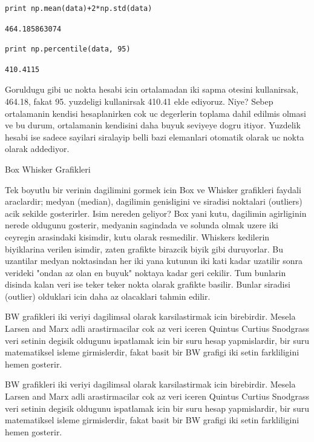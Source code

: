 \documentclass[12pt,fleqn]{article}\usepackage{../common}
\begin{document}
\begin{verbatim}
print np.mean(data)+2*np.std(data)
\end{verbatim}

\begin{verbatim}
464.185863074
\end{verbatim}

\begin{verbatim}
print np.percentile(data, 95)
\end{verbatim}

\begin{verbatim}
410.4115
\end{verbatim}

Goruldugu gibi uc nokta hesabi icin ortalamadan iki sapma otesini
kullanirsak, 464.18, fakat 95. yuzdeligi kullanirsak 410.41 elde
ediyoruz. Niye? Sebep ortalamanin kendisi hesaplanirken cok uc
degerlerin toplama dahil edilmis olmasi ve bu durum, ortalamanin
kendisini daha buyuk seviyeye dogru itiyor. Yuzdelik hesabi ise sadece
sayilari siralayip belli bazi elemanlari otomatik olarak uc nokta
olarak addediyor.

Box Whisker Grafikleri

Tek boyutlu bir verinin dagilimini gormek icin Box ve Whisker grafikleri
faydali araclardir; medyan (median), dagilimin genisligini ve siradisi
noktalari (outliers) acik sekilde gosterirler. Isim nereden geliyor? Box
yani kutu, dagilimin agirliginin nerede oldugunu gosterir, medyanin
sagindada ve solunda olmak uzere iki ceyregin arasindaki kisimdir, kutu
olarak resmedilir. Whiskers kedilerin biyiklarina verilen isimdir, zaten
grafikte birazcik biyik gibi duruyorlar. Bu uzantilar medyan noktasindan
her iki yana kutunun iki kati kadar uzatilir sonra verideki "ondan az olan
en buyuk" noktaya kadar geri cekilir. Tum bunlarin disinda kalan veri ise
teker teker nokta olarak grafikte basilir. Bunlar siradisi (outlier)
olduklari icin daha az olacaklari tahmin edilir.

BW grafikleri iki veriyi dagilimsal olarak karsilastirmak icin
birebirdir. Mesela Larsen and Marx adli arastirmacilar cok az veri
iceren Quintus Curtius Snodgrass veri setinin degisik oldugunu
ispatlamak icin bir suru hesap yapmislardir, bir suru matematiksel
isleme girmislerdir, fakat basit bir BW grafigi iki setin farkliligini
hemen gosterir.

BW grafikleri iki veriyi dagilimsal olarak karsilastirmak icin
birebirdir. Mesela Larsen and Marx adli arastirmacilar cok az veri
iceren Quintus Curtius Snodgrass veri setinin degisik oldugunu
ispatlamak icin bir suru hesap yapmislardir, bir suru matematiksel
isleme girmislerdir, fakat basit bir BW grafigi iki setin farkliligini
hemen gosterir.
\end{document}
